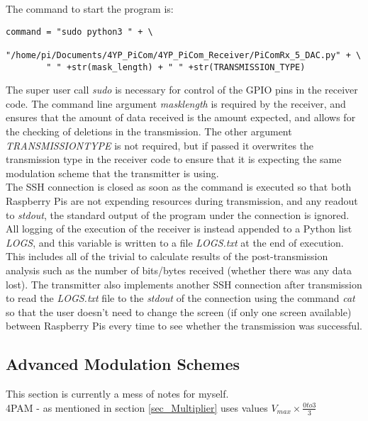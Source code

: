 \documentclass[../main.tex]{subfiles}
\begin{document}
The command to start the program is:

\begin{lstlisting}[caption=Command Line to Start the Receiver]
	command = "sudo python3 " + \
		"/home/pi/Documents/4YP_PiCom/4YP_PiCom_Receiver/PiComRx_5_DAC.py" + \
		" " +str(mask_length) + " " +str(TRANSMISSION_TYPE)
\end{lstlisting}

The super user call \textit{sudo} is necessary for control of the GPIO pins in the receiver code.
The command line argument \textit{mask\textunderscore length} is required by the receiver, and ensures that the amount of data received is the amount expected, and allows for the checking of deletions in the transmission.
The other argument \textit{TRANSMISSION\textunderscore TYPE} is not required, but if passed it overwrites the transmission type in the receiver code to ensure that it is expecting the same modulation scheme that the transmitter is using.\\

The SSH connection is closed as soon as the command is executed so that both Raspberry Pis are not expending resources during transmission, and any readout to \textit{stdout}, the standard output of the program under the connection is ignored.
All logging of the execution of the receiver is instead appended to a Python list \textit{LOGS}, and this variable is written to a file \textit{LOGS.txt} at the end of execution.
This includes all of the trivial to calculate results of the post-transmission analysis such as the number of bits/bytes received (whether there was any data lost).
The transmitter also implements another SSH connection after transmission to read the \textit{LOGS.txt} file to the \textit{stdout} of the connection using the command \textit{cat} so that the user doesn't need to change the screen (if only one screen available) between Raspberry Pis every time to see whether the transmission was successful.\\

\subsection{Advanced Modulation Schemes} \label{sec_Advanced Modulation Schemes}

This section is currently a mess of notes for myself.\\
4PAM - as mentioned in section \ref{sec_Multiplier} uses values $V_{max}\times\frac{0 to 3}{3}$
\end{document}
